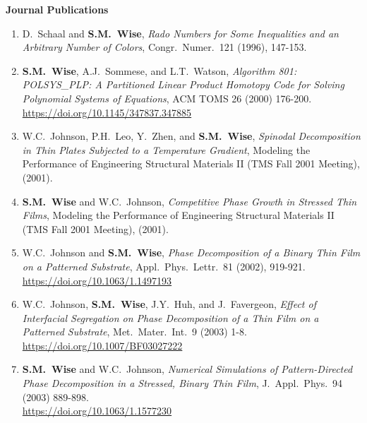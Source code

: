 \documentclass[11pt]{letter}
\begin{document}
{\LARGE\bf  Journal Publications}
    \begin{enumerate}

    \item
D.~Schaal and \textbf{S.M.~Wise}, {\sl Rado Numbers for Some Inequalities and an Arbitrary Number of Colors}, Congr.~Numer.~121 (1996), 147-153.

    \item
\textbf{S.M.~Wise}, A.J.~Sommese, and L.T.~Watson, {\sl Algorithm 801: POLSYS\_PLP: A Partitioned Linear Product Homotopy Code for Solving Polynomial Systems of Equations}, ACM TOMS 26 (2000) 176-200.
	\\
\url{https://doi.org/10.1145/347837.347885}

    \item
W.C.~Johnson, P.H.~Leo, Y.~Zhen, and \textbf{S.M.~Wise}, {\sl Spinodal Decomposition in Thin Plates Subjected to a Temperature Gradient}, Modeling the Performance of Engineering Structural Materials II (TMS Fall 2001 Meeting), (2001).

    \item
\textbf{S.M.~Wise} and W.C.~Johnson, {\sl Competitive Phase Growth in Stressed Thin Films}, Modeling the Performance of Engineering Structural Materials II (TMS Fall 2001 Meeting), (2001).

    \item
W.C.~Johnson and \textbf{S.M.~Wise}, {\sl Phase Decomposition of a Binary Thin Film on a Patterned Substrate}, Appl.~Phys.~Lettr.~81 (2002), 919-921.
	\\
\url{https://doi.org/10.1063/1.1497193}

    \item
W.C.~Johnson, \textbf{S.M.~Wise}, J.Y.~Huh, and J.~Favergeon, {\sl Effect of Interfacial Segregation on Phase Decomposition of a Thin Film on a Patterned Substrate}, Met.~Mater.~Int.~9 (2003) 1-8.
	\\
\url{https://doi.org/10.1007/BF03027222}

    \item
\textbf{S.M.~Wise} and W.C.~Johnson, {\sl Numerical Simulations of Pattern-Directed Phase Decomposition in a Stressed, Binary Thin Film}, J.~Appl.~Phys.~94 (2003) 889-898.
	\\
\url{https://doi.org/10.1063/1.1577230}


\end{enumerate}
\end{document}
